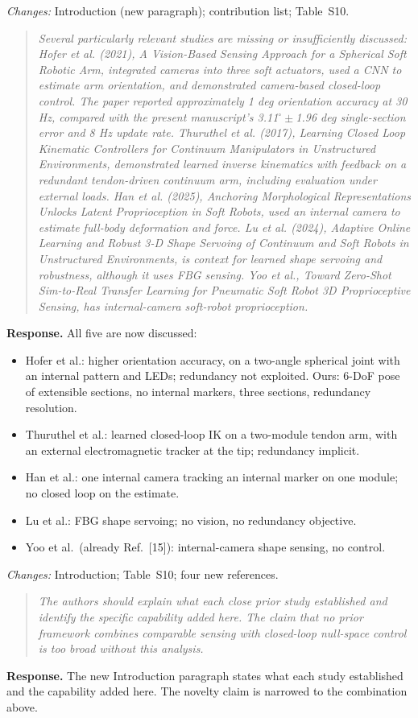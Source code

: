 \documentclass[11pt,a4paper]{article}
\newcommand{\rc}[1]{\begin{quote}\color{black!70}\itshape #1\end{quote}}
\begin{document}
\textit{Changes:} Introduction (new paragraph); contribution list; Table~S10.

\rc{Several particularly relevant studies are missing or insufficiently discussed: Hofer et al. (2021), A Vision-Based Sensing Approach for a Spherical Soft Robotic Arm, integrated cameras into three soft actuators, used a CNN to estimate arm orientation, and demonstrated camera-based closed-loop control. The paper reported approximately 1 deg orientation accuracy at 30 Hz, compared with the present manuscript's 3.11$^\circ\pm$1.96 deg single-section error and 8 Hz update rate. Thuruthel et al. (2017), Learning Closed Loop Kinematic Controllers for Continuum Manipulators in Unstructured Environments, demonstrated learned inverse kinematics with feedback on a redundant tendon-driven continuum arm, including evaluation under external loads. Han et al. (2025), Anchoring Morphological Representations Unlocks Latent Proprioception in Soft Robots, used an internal camera to estimate full-body deformation and force. Lu et al. (2024), Adaptive Online Learning and Robust 3-D Shape Servoing of Continuum and Soft Robots in Unstructured Environments, is context for learned shape servoing and robustness, although it uses FBG sensing. Yoo et al., Toward Zero-Shot Sim-to-Real Transfer Learning for Pneumatic Soft Robot 3D Proprioceptive Sensing, has internal-camera soft-robot proprioception.}
\textbf{Response.} All five are now discussed:
\begin{itemize}
\item Hofer et al.: higher orientation accuracy, on a two-angle spherical joint with an internal pattern and LEDs; redundancy not exploited. Ours: 6-DoF pose of extensible sections, no internal markers, three sections, redundancy resolution.
\item Thuruthel et al.: learned closed-loop IK on a two-module tendon arm, with an external electromagnetic tracker at the tip; redundancy implicit.
\item Han et al.: one internal camera tracking an internal marker on one module; no closed loop on the estimate.
\item Lu et al.: FBG shape servoing; no vision, no redundancy objective.
\item Yoo et al.\ (already Ref.~[15]): internal-camera shape sensing, no control.
\end{itemize}

\textit{Changes:} Introduction; Table~S10; four new references.

\rc{The authors should explain what each close prior study established and identify the specific capability added here. The claim that no prior framework combines comparable sensing with closed-loop null-space control is too broad without this analysis.}
\textbf{Response.} The new Introduction paragraph states what each study established and the capability added here. The novelty claim is narrowed to the combination above.
\end{document}
